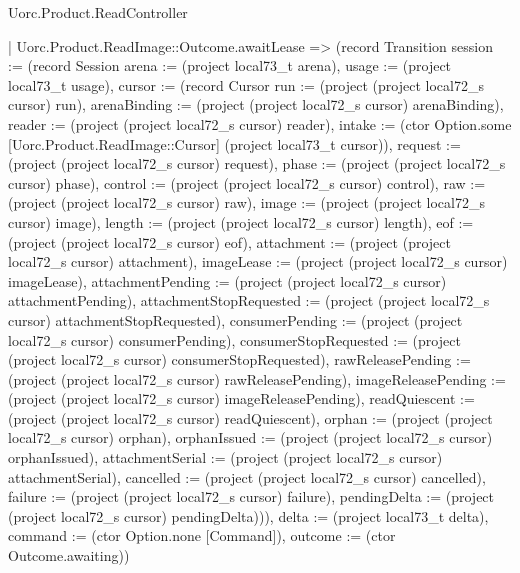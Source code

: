 \begin{lexlean}{Uorc.Product.ReadController}
\begin{semanticmodule}
{    | Uorc.Product.ReadImage::Outcome.awaitLease => (record Transition {session := (record Session {arena := (project local73_t arena), usage := (project local73_t usage), cursor := (record Cursor {run := (project (project local72_s cursor) run), arenaBinding := (project (project local72_s cursor) arenaBinding), reader := (project (project local72_s cursor) reader), intake := (ctor Option.some [Uorc.Product.ReadImage::Cursor] (project local73_t cursor)), request := (project (project local72_s cursor) request), phase := (project (project local72_s cursor) phase), control := (project (project local72_s cursor) control), raw := (project (project local72_s cursor) raw), image := (project (project local72_s cursor) image), length := (project (project local72_s cursor) length), eof := (project (project local72_s cursor) eof), attachment := (project (project local72_s cursor) attachment), imageLease := (project (project local72_s cursor) imageLease), attachmentPending := (project (project local72_s cursor) attachmentPending), attachmentStopRequested := (project (project local72_s cursor) attachmentStopRequested), consumerPending := (project (project local72_s cursor) consumerPending), consumerStopRequested := (project (project local72_s cursor) consumerStopRequested), rawReleasePending := (project (project local72_s cursor) rawReleasePending), imageReleasePending := (project (project local72_s cursor) imageReleasePending), readQuiescent := (project (project local72_s cursor) readQuiescent), orphan := (project (project local72_s cursor) orphan), orphanIssued := (project (project local72_s cursor) orphanIssued), attachmentSerial := (project (project local72_s cursor) attachmentSerial), cancelled := (project (project local72_s cursor) cancelled), failure := (project (project local72_s cursor) failure), pendingDelta := (project (project local72_s cursor) pendingDelta)})}), delta := (project local73_t delta), command := (ctor Option.none [Command]), outcome := (ctor Outcome.awaiting)})
}
\end{semanticmodule}
\end{lexlean}
